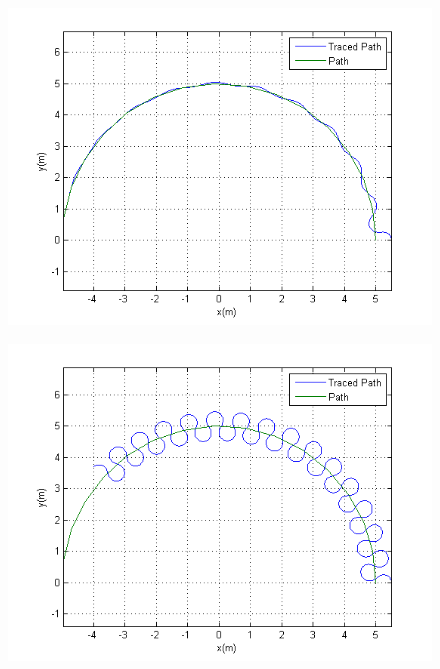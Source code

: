 \documentclass[12pt,a4paper, notitlepage]{article}
\begin{document}
\begin{figure}[ht]
\begin{minipage}{.5\textwidth}
	\includegraphics[width=\linewidth,keepaspectratio]{fig/Delay500milsec}
	\label{fig:delay500plot} 
\end{minipage} 
\hfill
\begin{minipage}{.5\textwidth}
	\centering
	\includegraphics[width=\linewidth,keepaspectratio]{fig/Delay800milsec}
	\label{fig:delay800plot} 
\end{minipage}
\end{figure}
\end{document}
